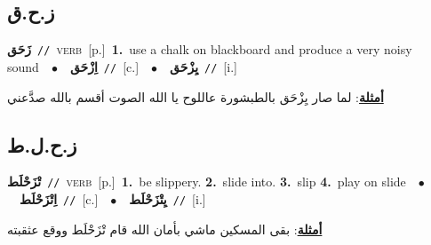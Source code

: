 \documentclass[10pt,a4paper,twoside]{article} %
\begin{document}
\begin{multicols}{2}
\vspace{-3mm}
\subsection*{\color{blue}\foreignlanguage{arabic}{ز.ح.ق}\color{blue}{}} 

{\setlength\topsep{0pt}\textbf{\foreignlanguage{arabic}{زَحَق}}\ {\color{gray}\texttt{//}\color{black}}\ \textsc{verb}\ [p.]\ \textbf{1.}~use a chalk on blackboard and produce a very noisy sound\ \ $\bullet$\ \ \setlength\topsep{0pt}\textbf{\foreignlanguage{arabic}{اِزْحَق}}\ {\color{gray}\texttt{//}\color{black}}\ [c.]\ \ $\bullet$\ \ \setlength\topsep{0pt}\textbf{\foreignlanguage{arabic}{يِزْحَق}}\ {\color{gray}\texttt{//}\color{black}}\ [i.]\  \begin{flushright}\color{gray}\foreignlanguage{arabic}{\textbf{\underline{\foreignlanguage{arabic}{أمثلة}}}: لما صار يِزْحَق بالطبشورة عاللوح يا الله الصوت أقسم بالله صدَّعني}\end{flushright}\color{black}} \vspace{2mm}

\vspace{-3mm}
\subsection*{\color{blue}\foreignlanguage{arabic}{ز.ح.ل.ط}\color{blue}{}} 

{\setlength\topsep{0pt}\textbf{\foreignlanguage{arabic}{تْزَحْلَط}}\ {\color{gray}\texttt{//}\color{black}}\ \textsc{verb}\ [p.]\ \textbf{1.}~be slippery.  \textbf{2.}~slide into.  \textbf{3.}~slip  \textbf{4.}~play on slide\ \ $\bullet$\ \ \setlength\topsep{0pt}\textbf{\foreignlanguage{arabic}{اِتْزَحْلَط}}\ {\color{gray}\texttt{//}\color{black}}\ [c.]\ \ $\bullet$\ \ \setlength\topsep{0pt}\textbf{\foreignlanguage{arabic}{يِتْزَحْلَط}}\ {\color{gray}\texttt{//}\color{black}}\ [i.]\  \begin{flushright}\color{gray}\foreignlanguage{arabic}{\textbf{\underline{\foreignlanguage{arabic}{أمثلة}}}: بقى المسكين ماشي بأمان الله قام تْزَحْلَط ووقع عثقبته}\end{flushright}\color{black}} \vspace{2mm}


\end{multicols}
\end{document}
